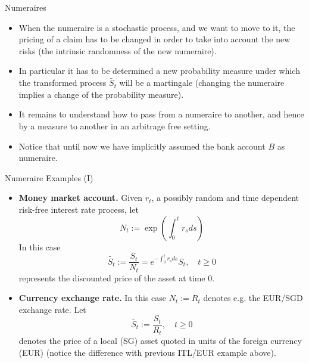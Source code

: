 \documentclass{beamer}
\begin{document}
\begin{frame}{Numeraires}
	\begin{itemize}
		\item When the numeraire is a stochastic process, and we want to move to it, the pricing of a claim has to be changed in order to take into account the new risks (the intrinsic randomness of the new numeraire).
		\item In particular it has to be determined a new probability measure under which the transformed process $\tilde{S_t}$ will be a martingale (changing the numeraire implies a change of the probability measure).
		\item It remains to understand how to pass from a numeraire to another, and hence by a measure to another in an arbitrage free setting.
		\item Notice that until now we have implicitly assumed the bank account $B$ as numeraire.
	\end{itemize}
\end{frame}

\begin{frame}{Numeraire Examples (I)}
	\begin{itemize}
		\item \textbf{Money market account.} Given $r_t$, a possibly random and time dependent risk-free interest rate process, let
		\begin{equation*}
			N_t := \exp\left(\int_0^t r_s ds\right)
		\end{equation*}
		In this case 
		\begin{equation*}
			\tilde{S_t}:=\frac{S_t}{N_t}=e^{-\int_0^t r_s ds}S_t, \quad t \ge 0
		\end{equation*}
		represents the discounted price of the asset at time 0.
		\item \textbf{Currency exchange rate.} In this case $N_t := R_t$ denotes e.g. the EUR/SGD exchange rate. Let
		\begin{equation*}
			\tilde{S_t}:=\frac{S_t}{R_t}, \quad t \ge 0
		\end{equation*}
		denotes the price of a local (SG) asset quoted in units of the foreign currency (EUR) (notice the difference with previous ITL/EUR example above).
	\end{itemize}
\end{frame}
\end{document}
